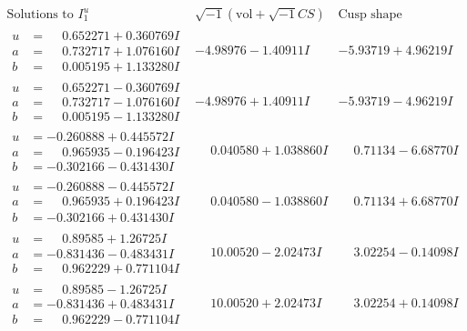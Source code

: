 \documentclass[1p]{elsarticle_modified}
\theoremstyle{definition}
\newcommand{\I}{\sqrt{-1}}
\begin{document}
$$\begin{array}{c|c|c}  
\text{Solutions to }I^u_{1}& \I (\text{vol} + \sqrt{-1}CS) & \text{Cusp shape}\\
 \hline 
\begin{aligned}
u &= \phantom{-}0.652271 + 0.360769 I \\
a &= \phantom{-}0.732717 + 1.076160 I \\
b &= \phantom{-}0.005195 + 1.133280 I\end{aligned}
 & -4.98976 - 1.40911 I & -5.93719 + 4.96219 I \\ \hline\begin{aligned}
u &= \phantom{-}0.652271 - 0.360769 I \\
a &= \phantom{-}0.732717 - 1.076160 I \\
b &= \phantom{-}0.005195 - 1.133280 I\end{aligned}
 & -4.98976 + 1.40911 I & -5.93719 - 4.96219 I \\ \hline\begin{aligned}
u &= -0.260888 + 0.445572 I \\
a &= \phantom{-}0.965935 - 0.196423 I \\
b &= -0.302166 - 0.431430 I\end{aligned}
 & \phantom{-}0.040580 + 1.038860 I & \phantom{-}0.71134 - 6.68770 I \\ \hline\begin{aligned}
u &= -0.260888 - 0.445572 I \\
a &= \phantom{-}0.965935 + 0.196423 I \\
b &= -0.302166 + 0.431430 I\end{aligned}
 & \phantom{-}0.040580 - 1.038860 I & \phantom{-}0.71134 + 6.68770 I \\ \hline\begin{aligned}
u &= \phantom{-}0.89585 + 1.26725 I \\
a &= -0.831436 - 0.483431 I \\
b &= \phantom{-}0.962229 + 0.771104 I\end{aligned}
 & \phantom{-}10.00520 - 2.02473 I & \phantom{-}3.02254 - 0.14098 I \\ \hline\begin{aligned}
u &= \phantom{-}0.89585 - 1.26725 I \\
a &= -0.831436 + 0.483431 I \\
b &= \phantom{-}0.962229 - 0.771104 I\end{aligned}
 & \phantom{-}10.00520 + 2.02473 I & \phantom{-}3.02254 + 0.14098 I \\ \hline\begin{aligned}

\end{aligned}
\end{array}$$
\end{document}
